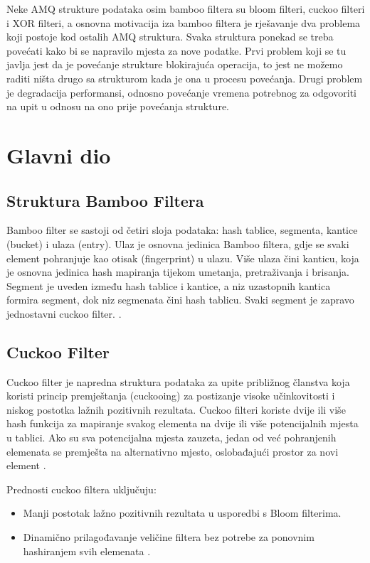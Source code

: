 \documentclass[seminarskirad]{fer}
\begin{document}
	Neke AMQ strukture podataka osim bamboo filtera su bloom filteri, cuckoo filteri i XOR filteri, a osnovna motivacija iza bamboo filtera je rješavanje dva problema koji postoje kod ostalih AMQ struktura. Svaka struktura ponekad se treba povećati kako bi se napravilo mjesta za nove podatke. Prvi problem koji se tu javlja jest da je povećanje strukture blokirajuća operacija, to jest ne možemo raditi ništa drugo sa strukturom kada je ona u procesu povećanja. Drugi problem je degradacija performansi, odnosno povećanje vremena potrebnog za odgovoriti na upit u odnosu na ono prije povećanja strukture.
	
	
	\chapter{Glavni dio}
	\label{pog:glavni_dio}
	
	\section{Struktura Bamboo Filtera}
	Bamboo filter se sastoji od četiri sloja podataka: hash tablice, segmenta, kantice (bucket) i ulaza (entry). Ulaz je osnovna jedinica Bamboo filtera, gdje se svaki element pohranjuje kao otisak (fingerprint) u ulazu. Više ulaza čini kanticu, koja je osnovna jedinica hash mapiranja tijekom umetanja, pretraživanja i brisanja. Segment je uveden između hash tablice i kantice, a niz uzastopnih kantica formira segment, dok niz segmenata čini hash tablicu. Svaki segment je zapravo jednostavni cuckoo filter. \cite{wang2022bamboo}.
	
	\section{Cuckoo Filter}
	Cuckoo filter je napredna struktura podataka za upite približnog članstva koja koristi princip premještanja (cuckooing) za postizanje visoke učinkovitosti i niskog postotka lažnih pozitivnih rezultata. Cuckoo filteri koriste dvije ili više hash funkcija za mapiranje svakog elementa na dvije ili više potencijalnih mjesta u tablici. Ako su sva potencijalna mjesta zauzeta, jedan od već pohranjenih elemenata se premješta na alternativno mjesto, oslobađajući prostor za novi element \cite{fan2013cuckoo}.
	
	Prednosti cuckoo filtera uključuju:
	\begin{itemize}
		\item Manji postotak lažno pozitivnih rezultata u usporedbi s Bloom filterima.
		\item Dinamično prilagođavanje veličine filtera bez potrebe za ponovnim hashiranjem svih elemenata \cite{fan2014cuckoo}.
	\end{itemize}
	
\end{document}
